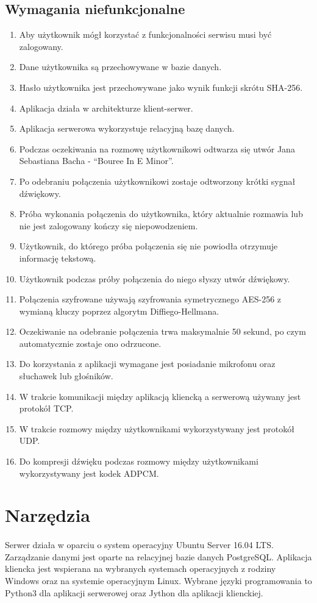 \documentclass{article}
\begin{document}
  \subsection{Wymagania niefunkcjonalne}
  \begin{enumerate}
    \item Aby użytkownik mógł korzystać z funkcjonalności serwisu musi być zalogowany.
    \item Dane użytkownika są przechowywane w bazie danych.
    \item Hasło użytkownika jest przechowywane jako wynik funkcji skrótu SHA-256.
    \item Aplikacja działa w architekturze klient-serwer.
    \item Aplikacja serwerowa wykorzystuje relacyjną bazę danych.
    \item Podczas oczekiwania na rozmowę użytkownikowi odtwarza się utwór Jana Sebastiana Bacha - “Bouree In E Minor”.
    \item Po odebraniu połączenia użytkownikowi zostaje odtworzony krótki sygnał dźwiękowy.
    \item Próba wykonania połączenia do użytkownika, który aktualnie rozmawia lub nie jest zalogowany kończy się niepowodzeniem.
    \item Użytkownik, do którego próba połączenia się nie powiodła otrzymuje informację tekstową.
    \item Użytkownik podczas próby połączenia do niego słyszy utwór dźwiękowy.
    \item Połączenia szyfrowane używają szyfrowania symetrycznego AES-256 z wymianą kluczy poprzez algorytm Diffiego-Hellmana.
    \item Oczekiwanie na odebranie połączenia trwa maksymalnie 50 sekund, po czym automatycznie zostaje ono odrzucone.
    \item Do korzystania z aplikacji wymagane jest posiadanie mikrofonu oraz słuchawek lub głośników.
    \item W trakcie komunikacji między aplikacją kliencką a serwerową używany jest protokół TCP.
    \item W trakcie rozmowy między użytkownikami wykorzystywany jest protokół UDP.
    \item Do kompresji dźwięku podczas rozmowy między użytkownikami wykorzystywany jest kodek ADPCM.
  \end{enumerate}
  \section{Narzędzia}
  \paragraph{}Serwer działa w oparciu o system operacyjny Ubuntu Server 16.04 LTS. Zarządzanie danymi jest oparte na relacyjnej bazie danych PostgreSQL. Aplikacja kliencka jest wspierana na wybranych systemach operacyjnych z rodziny Windows oraz na systemie operacyjnym Linux. Wybrane języki programowania to Python3 dla aplikacji serwerowej oraz Jython dla aplikacji klienckiej.
\end{document}
